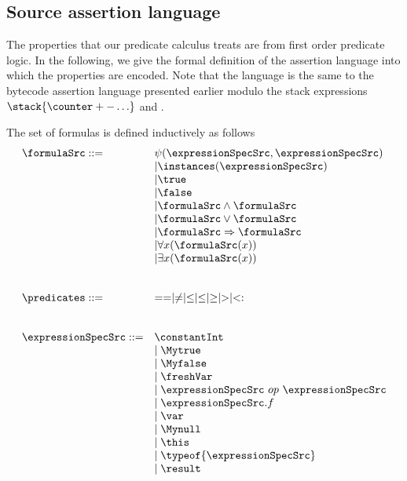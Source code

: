 
\subsection{Source assertion language} \label{formulasSrc}
The properties that our predicate calculus treats are from first order predicate logic.
In the following, we give the formal definition of the assertion language into which 
the properties are encoded. Note that the language is the same  to the bytecode assertion 
language presented earlier modulo the stack expressions $\stack{\counter + - \ldots}$ and \counter.  


 

\begin{Formula}[Definition]
The set of formulas is defined inductively as follows
	$$
	\begin{array}{ll}
	\formulaSrc ::= & \psi(\expressionSpecSrc,  \expressionSpecSrc )\\
	  & \vert  \instances(\expressionSpecSrc)\\
	  & \vert \true \\
	  & \vert  \false \\	
	  & \vert \formulaSrc \wedge \formulaSrc \\
	  & \vert \formulaSrc \vee  \formulaSrc \\
	  & \vert \formulaSrc \Rightarrow \formulaSrc \\
	  & \vert \forall x  (  \formulaSrc(x) ) \\
	  & \vert \exists x  ( \formulaSrc (x))	 \\
      
          & \\
	  & \\
	  \predicates ::=  &   == \mid \neq \mid \leq \mid \le \mid \geq \mid > \mid  <: \\
	  & \\
	  & \\
	  \expressionSpecSrc  ::= & \constantInt  \\
	                          & \mid \Mytrue \\ 
	                          & \mid \Myfalse \\
	                          & \mid \freshVar \\
				  & \mid \expressionSpecSrc \ op \ \expressionSpecSrc \\  
				  & \mid \expressionSpecSrc.f \\
				  & \mid \var \\
  			          & \mid \Mynull  \\
				  & \mid \this \\
	                          & \mid \typeof{\expressionSpecSrc} \\
	                          & \mid \result
                                  
	\end{array}
	$$ 
\end{Formula}

